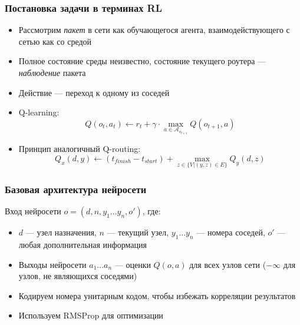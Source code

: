 \documentclass{beamer}
\begin{document}
\begin{frame}
  \frametitle{Постановка задачи в терминах RL}
  \begin{itemize}
    \item Рассмотрим \textit{пакет} в сети как обучающегося агента,
      взаимодействующего с сетью как со средой
    \item Полное состояние среды неизвестно, состояние текущего роутера ---
      \textit{наблюдение} пакета
    \item Действие --- переход к одному из соседей
    \item Q-learning:
      \[
      Q(o_t, a_t) \leftarrow r_t + \gamma \cdot
      \max\limits_{a \in \mathcal{A}_{o_{t+1}}} {Q(o_{t+1}, a)}
      \]
    \item Принцип аналогичный Q-routing:
      \[
      Q_x(d, y) \leftarrow (t_{finish} - t_{start}) +
      \max\limits_{z \in \{ V | (y, z) \in E\}} {Q_y(d, z)}
      \]
  \end{itemize}
\end{frame}


\begin{frame}
  \frametitle{Базовая архитектура нейросети}
  Вход нейросети $o = (d, n, y_1 ... y_n, o')$, где:
  \begin{itemize}
  \item $d$ --- узел назначения, $n$ --- текущий узел, $y_1 ... y_n$ --- номера
    соседей, $o'$ --- любая дополнительная информация
  \item Выходы нейросети $a_1 ... a_n$ --- оценки $Q(o, a)$ для всех узлов сети
    ($-\infty$ для узлов, не являющихся соседями)
  \item Кодируем номера унитарным кодом, чтобы избежать корреляции результатов
  \item Используем RMSProp для оптимизации
  \end{itemize}
\end{frame}

\end{document}
